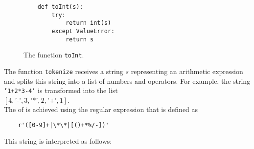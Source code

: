 \begin{figure}[!ht]
\centering
\begin{verbatim}
    def toInt(s):
        try:
            return int(s)   
        except ValueError:
            return s                
\end{verbatim}
\vspace*{-0.3cm}
\caption{The function \texttt{toInt}.}
\label{fig:toInt.py}
\end{figure}

The function \texttt{tokenize} receives a string $s$ representing an arithmetic expression and splits this
string into a list of numbers and operators. For example, the string \texttt{'1+2*3-4'} is transformed into the list
\\[0.2cm]
\hspace*{1.3cm}
$[4, \texttt{'-'}, 3, \texttt{'*'}, 2, \texttt{'+'}, 1]$.
\\[0.2cm]
The  of is achieved using the regular expression that is defined as
\begin{verbatim}
    r'([0-9]+|\*\*|[()+*%/-])'
\end{verbatim}
This string is interpreted as follows:

